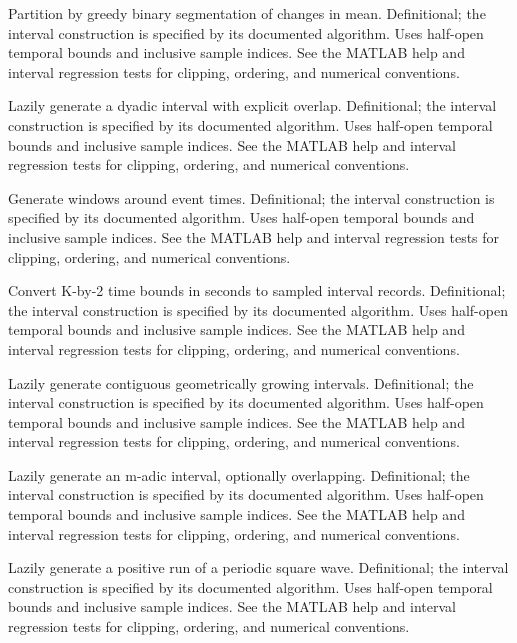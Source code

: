 {Partition by greedy binary segmentation of changes in mean.}
{Definitional; the interval construction is specified by its documented algorithm.}
{Uses half-open temporal bounds and inclusive sample indices. See the MATLAB help and interval regression tests for clipping, ordering, and numerical conventions.}

{Lazily generate a dyadic interval with explicit overlap.}
{Definitional; the interval construction is specified by its documented algorithm.}
{Uses half-open temporal bounds and inclusive sample indices. See the MATLAB help and interval regression tests for clipping, ordering, and numerical conventions.}

{Generate windows around event times.}
{Definitional; the interval construction is specified by its documented algorithm.}
{Uses half-open temporal bounds and inclusive sample indices. See the MATLAB help and interval regression tests for clipping, ordering, and numerical conventions.}

{Convert K-by-2 time bounds in seconds to sampled interval records.}
{Definitional; the interval construction is specified by its documented algorithm.}
{Uses half-open temporal bounds and inclusive sample indices. See the MATLAB help and interval regression tests for clipping, ordering, and numerical conventions.}

{Lazily generate contiguous geometrically growing intervals.}
{Definitional; the interval construction is specified by its documented algorithm.}
{Uses half-open temporal bounds and inclusive sample indices. See the MATLAB help and interval regression tests for clipping, ordering, and numerical conventions.}

{Lazily generate an m-adic interval, optionally overlapping.}
{Definitional; the interval construction is specified by its documented algorithm.}
{Uses half-open temporal bounds and inclusive sample indices. See the MATLAB help and interval regression tests for clipping, ordering, and numerical conventions.}

{Lazily generate a positive run of a periodic square wave.}
{Definitional; the interval construction is specified by its documented algorithm.}
{Uses half-open temporal bounds and inclusive sample indices. See the MATLAB help and interval regression tests for clipping, ordering, and numerical conventions.}

